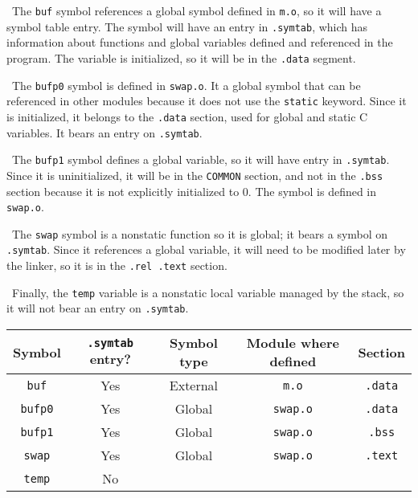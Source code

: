 \documentclass[12pt]{article}
\newenvironment{sol}[1][Solution]{\begin{trivlist}
		\item[\hskip \labelsep {\bfseries #1:}]}{\end{trivlist}}
\begin{document}
\begin{sol}
	\
	The \texttt{buf} symbol references a global symbol defined in \texttt{m.o}, so it will have
	a symbol table entry. The symbol will have an entry in \texttt{.symtab}, which
	has information about functions and global variables defined and referenced in the program.
	The variable is initialized, so it will be in the \texttt{.data} segment.
	
	\
	The \texttt{bufp0} symbol is defined in \texttt{swap.o}. It a global symbol that can be referenced
	in other modules because it does not use the \texttt{static} keyword. Since it is initialized, it
	belongs to the \texttt{.data} section, used for global and static C variables. It bears
	an entry on \texttt{.symtab}.
	
	\
	The \texttt{bufp1} symbol defines a global variable, so it will have entry in \texttt{.symtab}.
	Since it is uninitialized, it will be in the \texttt{COMMON} section, and not in the \texttt{.bss}
	section because it is not explicitly initialized to 0. The symbol is defined in \texttt{swap.o}.
	
	\
	The \texttt{swap} symbol is a nonstatic function so it is global; it bears a symbol
	on \texttt{.symtab}. Since it references a global variable, it will need to be modified
	later by the linker, so it is in the \texttt{.rel .text} section.
	
	\
	Finally, the \texttt{temp} variable is a nonstatic local variable managed by the stack, so it
	will not bear an entry on \texttt{.symtab}.
	\begin{center}
		\begin{tabular}{ccccc}
			Symbol & \texttt{.symtab} entry? & Symbol type & Module where defined & Section\\
			\hline
			\texttt{buf} & Yes & External & \texttt{m.o} & \texttt{.data}\\
			
			\texttt{bufp0} & Yes & Global & \texttt{swap.o} & \texttt{.data}\\
			
			\texttt{bufp1} & Yes & Global & \texttt{swap.o} & \texttt{.bss} \\
			
			\texttt{swap} & Yes & Global & \texttt{swap.o} & \texttt{.text}\\
			
			\texttt{temp} & No & \makebox[1cm]{\hrulefill} & \makebox[1cm]{\hrulefill} & \makebox[1cm]{\hrulefill}\\
			
		\end{tabular}
	\end{center}
\end{sol}
\end{document}
